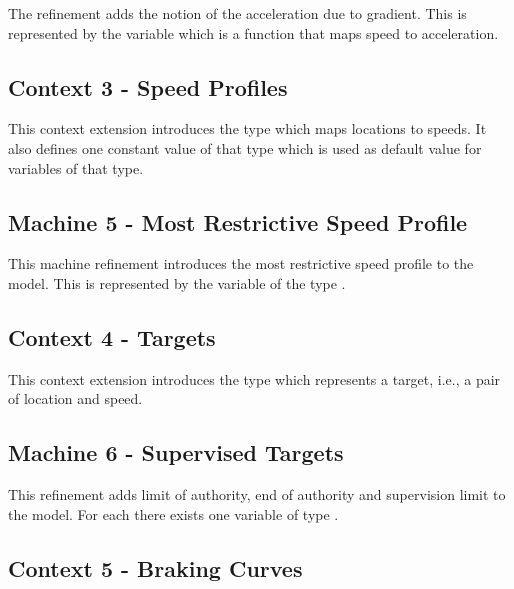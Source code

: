 \documentclass{template/openetcs_article}
\begin{document}
The refinement adds the notion of the acceleration due to gradient. This is
represented by the variable  which is a function that maps
speed to acceleration.

{\footnotesize

}

\subsection{Context 3 - Speed Profiles}
\label{sec:context-3-speed}

This context extension introduces the type  which maps
locations to speeds. It also defines one constant value of that type which is
used as default value for variables of that type.

{\footnotesize

}

\subsection{Machine 5 - Most Restrictive Speed Profile}
\label{sec:machine-5-most}

This machine refinement introduces the most restrictive speed profile to the
model. This is represented by the variable  of the type
.

{\footnotesize

}

\subsection{Context 4 - Targets}
\label{sec:context-4-targets}

This context extension introduces the type  which represents a
target, i.e., a pair of location and speed.

{\footnotesize

}

\subsection{Machine 6 - Supervised Targets}
\label{sec:machine-6-supervised}

This refinement adds limit of authority, end of authority and supervision limit
to the model. For each there exists one variable of type .

{\footnotesize

}

\subsection{Context 5 - Braking Curves}
\label{sec:context-5-braking}
\end{document}
